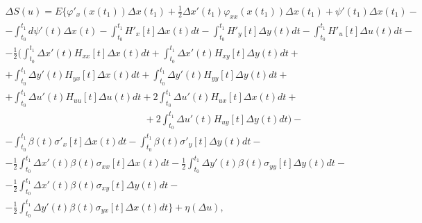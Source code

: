 \begin{multline}

\Delta S(u)=E \biggl\lbrace   

\varphi'_{x}(x(t_{1})) \Delta x(t_{1})+\frac{1}{2} \Delta x'(t_{1}) \varphi_{xx}(x(t_{1})) \Delta x(t_{1})+\psi'(t_{1}) \Delta x(t_{1}) -

\\

 -\int^{t_{1}}_{t_{0}} d\psi'(t) \Delta x(t)- \int^{t_{1}}_{t_{0}} H'_{x}[t] \Delta x(t)dt-\int^{t_{1}}_{t_{0}} H'_{y}[t] \Delta y(t)dt-\int^{t_{1}}_{t_{0}} H'_{u}[t] \Delta u(t)dt 

-

\\ 

-\frac{1}{2} \biggl( 

\int^{t_{1}}_{t_{0}} \Delta x'(t)H_{xx}[t] \Delta x(t)dt+  \int^{t_{1}}_{t_{0}} \Delta x'(t)H_{xy}[t] \Delta y(t)dt+ 

\\

+

\int^{t_{1}}_{t_{0}} \Delta y'(t)H_{yx}[t] \Delta x(t)dt+\int^{t_{1}}_{t_{0}} \Delta y'(t)H_{yy}[t] \Delta y(t)dt+

\\

+\int^{t_{1}}_{t_{0}} \Delta u'(t)H_{uu}[t] \Delta u(t)dt+2\int^{t_{1}}_{t_{0}} \Delta u'(t)H_{ux}[t] \Delta x(t)dt+

\\

\hspace{6cm} + 2\int^{t_{1}}_{t_{0}} \Delta u'(t)H_{uy}[t] \Delta y(t)dt \biggr) -\\

  -\int^{t_{1}}_{t_{0}} \beta (t) \sigma'_{x}[t] \Delta x(t)dt-

\int^{t_{1}}_{t_{0}} \beta (t) \sigma'_{y}[t] \Delta y(t)dt -

\\ 

-\frac{1}{2}\int^{t_{1}}_{t_{0}} \Delta x'(t) \beta (t) \sigma_{xx}[t] \Delta x(t)dt- 

\frac{1}{2}\int^{t_{1}}_{t_{0}} \Delta y'(t) \beta (t) \sigma_{yy}[t] \Delta y(t)dt

-

\\ -\frac{1}{2}\int^{t_{1}}_{t_{0}} \Delta x'(t) \beta (t) \sigma_{xy}[t] \Delta y(t)dt -

\\	

 -\frac{1}{2}\int^{t_{1}}_{t_{0}} \Delta y'(t) \beta (t) \sigma_{yx}[t] \Delta x(t)dt\biggr\rbrace +\eta(\Delta u), 

\label{mast:e11}

\end{multline}

